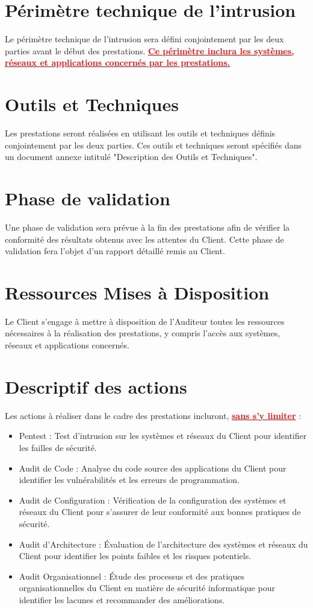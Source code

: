 \documentclass[12pt]{extarticle}
\begin{document}
\chapter{Périmètre technique de l’intrusion}
Le périmètre technique de l'intrusion sera défini conjointement par les deux parties avant le début des prestations. \textcolor{red}{\textbf{\underline{Ce périmètre inclura les systèmes, réseaux et applications concernés par les prestations.}}}
\chapter{Outils et Techniques}
Les prestations seront réalisées en utilisant les outils et techniques définis conjointement par les deux parties. Ces outils et techniques seront spécifiés dans un document annexe intitulé "Description des Outils et Techniques".
\chapter{Phase de validation}
Une phase de validation sera prévue à la fin des prestations afin de vérifier la conformité des résultats obtenus avec les attentes du Client. Cette phase de validation fera l'objet d'un rapport détaillé remis au Client.
\chapter{Ressources Mises à Disposition}
Le Client s'engage à mettre à disposition de l'Auditeur toutes les ressources nécessaires à la réalisation des prestations, y compris l'accès aux systèmes, réseaux et applications concernés.
\chapter{Descriptif des actions}
Les actions à réaliser dans le cadre des prestations incluront, \textcolor{red}{\textbf{\underline{sans s'y limiter}}} :
\begin{itemize}
    \item Pentest : Test d'intrusion sur les systèmes et réseaux du Client pour identifier les failles de sécurité.
    \item Audit de Code : Analyse du code source des applications du Client pour identifier les vulnérabilités et les erreurs de programmation.
    \item Audit de Configuration : Vérification de la configuration des systèmes et réseaux du Client pour s'assurer de leur conformité aux bonnes pratiques de sécurité.
    \item Audit d'Architecture : Évaluation de l'architecture des systèmes et réseaux du Client pour identifier les points faibles et les risques potentiels.
    \item Audit Organisationnel : Étude des processus et des pratiques organisationnelles du Client en matière de sécurité informatique pour identifier les lacunes et recommander des améliorations.
\end{itemize}
\newpage
\end{document}
